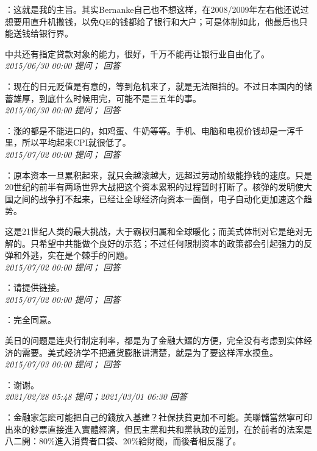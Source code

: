 \documentclass[twocolumn]{ctexart}
\begin{document}
：这就是我的主旨。其实Bernanke自己也不想这样，在2008/2009年左右他还说过想要用直升机撒钱，以免QE的钱都给了银行和大户；可是体制如此，他最后也只能送钱给银行界。

中共还有指定贷款对象的能力，很好，千万不能再让银行业自由化了。\\

\textit{\hfill\noindent\small 2015/06/30 00:00 提问； 回答}

：现在的日元贬值是有意的，等到危机来了，就是无法阻挡的。不过日本国内的储蓄雄厚，到底什么时候用完，可能不是三五年的事。\\

\textit{\hfill\noindent\small 2015/06/30 00:00 提问； 回答}

：涨的都是不能进口的，如鸡蛋、牛奶等等。手机、电脑和电视价钱却是一泻千里，所以平均起来CPI就很低了。\\

\textit{\hfill\noindent\small 2015/07/02 00:00 提问； 回答}

：原本资本一旦累积起来，就只会越滚越大，远超过劳动阶级能挣钱的速度。只是20世纪的前半有两场世界大战把这个资本累积的过程暂时打断了。核弹的发明使大国之间的战争打不起来，已经让全球经济向资本一面倒，电子自动化更加速这个趋势。

这是21世纪人类的最大挑战，大于霸权归属和全球暖化；而美式体制对它是绝对无解的。只希望中共能做个良好的示范；不过任何限制资本的政策都会引起强力的反弹和外逃，实在是个棘手的问题。\\

\textit{\hfill\noindent\small 2015/07/02 00:00 提问； 回答}

：请提供链接。\\

\textit{\hfill\noindent\small 2015/07/02 00:00 提问； 回答}

：完全同意。

美日的问题是连央行制定利率，都是为了金融大鱷的方便，完全没有考虑到实体经济的需要。美式经济学不把通货膨胀讲清楚，就是为了要这样浑水摸鱼。\\

\textit{\hfill\noindent\small 2015/07/03 00:00 提问； 回答}

：谢谢。\\

\textit{\hfill\noindent\small 2021/02/28 05:48 提问；2021/03/01 06:30 回答}

：金融家怎麽可能把自己的錢放入基建？社保扶貧更加不可能。美聯儲當然寧可印出來的鈔票直接進入實體經濟，但民主黨和共和黨執政的差別，在於前者的法案是八二開：80\%進入消費者口袋、20\%給財閥，而後者相反罷了。
\\
\end{document}
